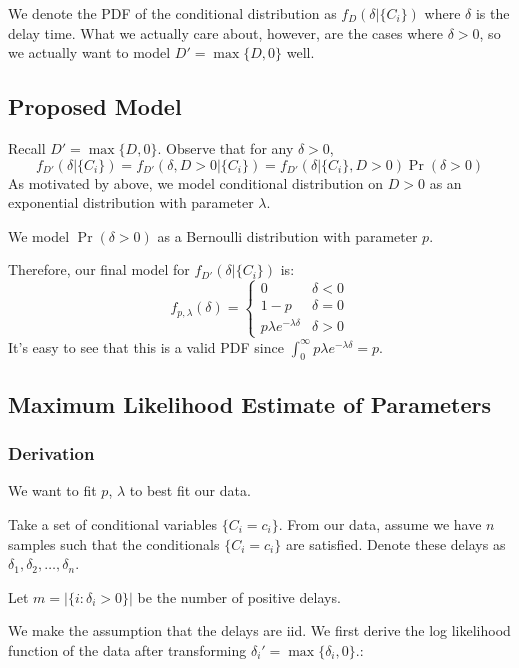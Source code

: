 \documentclass{article}
\begin{document}
We denote the PDF of the conditional distribution as $f_D(\delta|\{C_i\})$ where $\delta$ is the delay time. What we actually care about, however, are
the cases where $\delta > 0$, so we actually want to model $D' = \max \{D, 0\}$ well.

\subsection{Proposed Model}
Recall $D' = \max \{D, 0\}$. Observe that for any $\delta > 0$,
$$f_{D'}(\delta | \{C_i\}) = f_{D'}(\delta, D > 0 | \{C_i\}) = f_{D'}(\delta | \{C_i\}, D > 0)\Pr(\delta > 0)$$
As motivated by above, we model conditional distribution on $D > 0$ as an exponential distribution with parameter $\lambda$.

We model $\Pr(\delta > 0)$ as a Bernoulli distribution with parameter $p$.

Therefore, our final model for $f_{D'}(\delta | \{C_i\})$ is:
$$f_{p, \lambda}(\delta) = \begin{cases}
  0 & \delta < 0 \\
  1 - p & \delta = 0 \\
  p\lambda e^{-\lambda \delta} & \delta > 0
\end{cases}$$
It's easy to see that this is a valid PDF since $\int_0^\infty p\lambda e^{-\lambda \delta} = p$.

\subsection{Maximum Likelihood Estimate of Parameters}
\subsubsection{Derivation}
We want to fit $p$, $\lambda$ to best fit our data.

Take a set of conditional variables $\{C_i=c_i\}$. From our data, assume we have $n$ samples such that the conditionals $\{C_i=c_i\}$ are
satisfied. Denote these delays as $\delta_1, \delta_2, \ldots, \delta_n$.

Let $m = |\{i: \delta_i > 0\}|$ be the number of positive delays.

We make the assumption that the delays are iid. We first derive the log likelihood function of the data after transforming $\delta_i' = \max\{\delta_i, 0\}$.:
\end{document}
